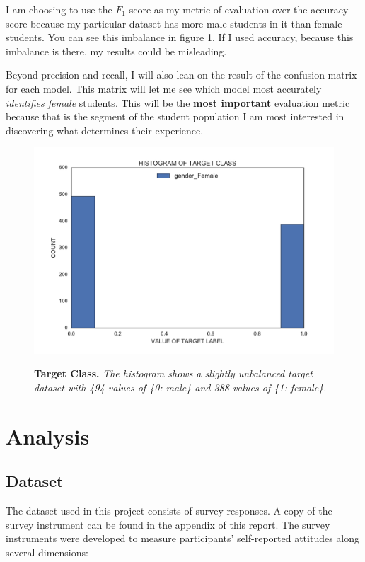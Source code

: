 I am choosing to use the $F_1$ score as my metric of evaluation over the accuracy score because my particular dataset has more male students in it than female students. You can see this imbalance in figure \ref{targetClass}. If I used accuracy, because this imbalance is there, my results could be misleading. 

Beyond precision and recall, I will also lean on the result of the confusion matrix for each model. This matrix will let me see which model most accurately \emph{identifies female} students. This will be the \textbf{most important} evaluation metric because that is the segment of the student population I am most interested in discovering what determines their experience.

\begin{figure}[!hbtp]
\centering

    \caption{\textbf{Target Class. }\textit{The histogram shows a slightly unbalanced target dataset with 494 values of \{0: male\} and 388 values of \{1: female\}.}}

    \includegraphics[width=1\textwidth]{figures/targetClass}
    \label{targetClass}
\end{figure}


\chapter*{Analysis}

\section* {Dataset}
The dataset used in this project consists of survey responses. A copy of the survey instrument can be found in the appendix of this report. The survey instruments were developed to measure participants' self-reported attitudes along several dimensions: 

